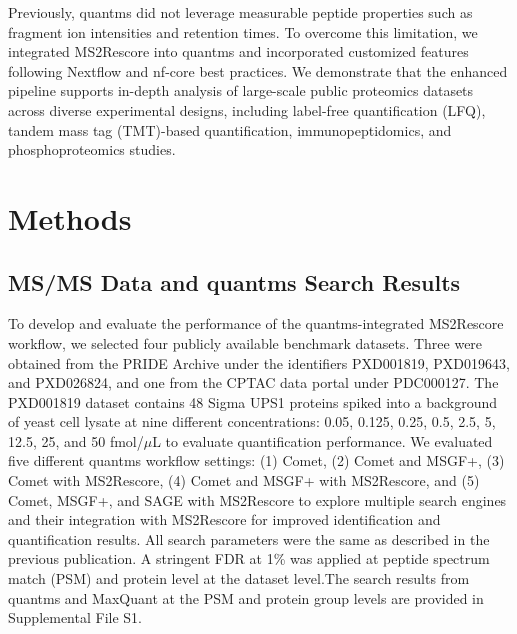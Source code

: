 \documentclass[12pt]{article}
\begin{document}
Previously, quantms did not leverage measurable peptide properties such as fragment ion intensities and retention times. To overcome this limitation, we integrated MS2Rescore into quantms and incorporated customized features following Nextflow and nf-core best practices. We demonstrate that the enhanced pipeline supports in-depth analysis of large-scale public proteomics datasets across diverse experimental designs, including label-free quantification (LFQ), tandem mass tag (TMT)-based quantification, immunopeptidomics, and phosphoproteomics studies.

\section{Methods}

\subsection{MS/MS Data and quantms Search Results}
To develop and evaluate the performance of the quantms-integrated MS2Rescore workflow, we selected four publicly available benchmark datasets. Three were obtained from the PRIDE Archive under the identifiers PXD001819, PXD019643, and PXD026824, and one from the CPTAC data portal under PDC000127. The PXD001819 dataset contains 48 Sigma UPS1 proteins spiked into a background of yeast cell lysate at nine different concentrations: 0.05, 0.125, 0.25, 0.5, 2.5, 5, 12.5, 25, and 50 fmol/$\mu$L to evaluate quantification performance. We evaluated five different quantms workflow settings: (1) Comet, (2) Comet and MSGF+, (3) Comet with MS2Rescore, (4) Comet and MSGF+ with MS2Rescore, and (5) Comet, MSGF+, and SAGE with MS2Rescore to explore multiple search engines and their integration with MS2Rescore for improved identification and quantification results. All search parameters were the same as described in the previous publication. A stringent FDR at 1\% was applied at peptide spectrum match (PSM) and protein level at the dataset level.The search results from quantms and MaxQuant at the PSM and protein group levels are provided in Supplemental File S1.
\end{document}
